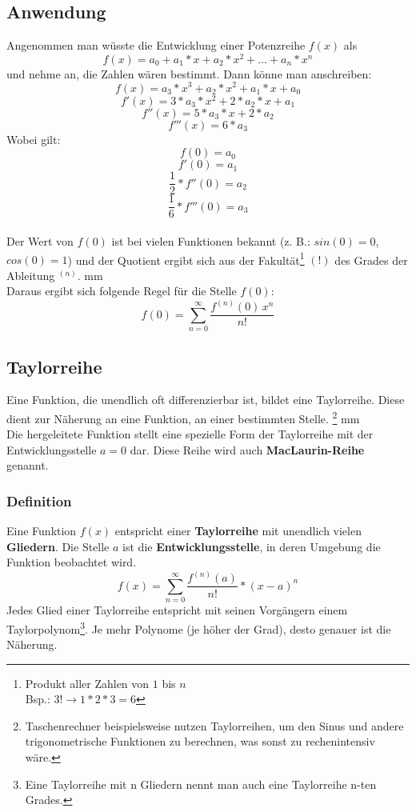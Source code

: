 \documentclass{school}
\begin{document}
\newpage
\subsection{Anwendung}
Angenommen man w\"usste die Entwicklung einer Potenzreihe $f(x)$ als $$f(x) = a_0 + a_1*x + a_2*x^2 + ... + a_n*x^n$$ und nehme an, die Zahlen wären bestimmt. Dann könne man anschreiben:
\[f(x)=a_3*x^3+a_2*x^2+a_1*x+a_0\]
\[f'(x)=3*a_3*x^2+2*a_2*x+a_1\]
\[f''(x)=5*a_3*x+2*a_2\]
\[f'''(x)=6*a_3\]
Wobei gilt:
$$f(0)=a_0$$
$$f'(0)=a_1$$
$$\frac{1}{2}*f''(0)=a_2$$
$$\frac{1}{6}*f'''(0)=a_3$$
\\
Der Wert von $f(0)$ ist bei vielen Funktionen bekannt (z. B.: $sin(0) = 0$, $cos(0) = 1$) und der Quotient ergibt sich aus der Fakultät\footnote{Produkt aller Zahlen von $1$ bis $n$\\Bsp.: $3! \to 1 * 2 * 3 = 6$} $(!)$ des Grades der Ableitung $^(n)$.
 mm ~\\
Daraus ergibt sich folgende Regel f\"ur die Stelle $f(0)$:
\[f(0)=\sum_{n=0}^{\infty }{\left. \frac{{{f}^{(n)}(0)}\, {{x}^{n}}}{n!}\right.}\]

\newpage
\subsection{Taylorreihe}
Eine Funktion, die unendlich oft differenzierbar ist, bildet eine Taylorreihe. Diese dient zur N\"aherung an eine Funktion, an einer bestimmten Stelle.
\footnote{Taschenrechner beispielsweise nutzen Taylorreihen, um den Sinus und andere trigonometrische Funktionen zu berechnen, was sonst zu rechenintensiv wäre.}
 mm ~\\
Die hergeleitete Funktion stellt eine spezielle Form der Taylorreihe mit der Entwicklungsstelle $a = 0$ dar. Diese Reihe wird auch \textbf{MacLaurin-Reihe} genannt.

\subsubsection{Definition}
Eine Funktion $f(x)$ entspricht einer \textbf{Taylorreihe} mit unendlich vielen \textbf{Gliedern}. Die Stelle $a$ ist die \textbf{Entwicklungsstelle}, in deren Umgebung die Funktion beobachtet wird.
$$f(x)=\sum_{n=0}^\infty \frac{f^{(n)}(a)}{n!}*(x-a)^n$$
Jedes Glied einer Taylorreihe entspricht mit seinen Vorgängern einem Taylorpolynom\footnote{Eine Taylorreihe mit n Gliedern nennt man auch eine Taylorreihe n-ten Grades.}. Je mehr Polynome (je höher der Grad), desto genauer ist die Näherung.
\end{document}
